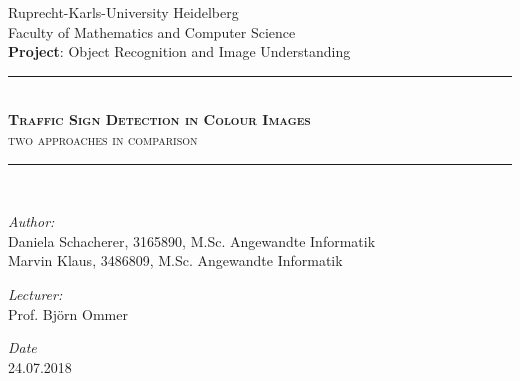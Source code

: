 \documentclass[12pt,a4paper,bibliography=totocnumbered,listof=totocnumbered]{scrartcl}
\begin{document}
\begin{titlepage}

\newcommand{\HRule}{\rule{\linewidth}{0.5mm}} %

\center %

\LARGE Ruprecht-Karls-University Heidelberg \\[0.5cm] %
\Large Faculty of Mathematics and Computer Science \\[1.5cm]
\Large \textbf{Project}: Object Recognition and Image Understanding\\[0.5cm] %

\HRule \\[0.4cm]
{ \textsc{\huge \bfseries Traffic Sign Detection in Colour Images}}\\ \textsc{\Large two approaches in comparison}\\[0.4cm] %
\HRule \\[1.5cm]

\begin{minipage}{0.4\textwidth}
\begin{flushleft} \large
\emph{Author:}\\
Daniela Schacherer, 3165890, M.Sc. Angewandte Informatik \\
Marvin Klaus, 3486809, M.Sc. Angewandte Informatik \\%
\end{flushleft}

\begin{flushleft} \large
\emph{Lecturer:}\\
Prof. Björn Ommer \\ %
\end{flushleft}

\begin{flushleft} \large
\emph{Date}\\
24.07.2018 \\%
\end{flushleft}

\end{minipage}
~
\begin{minipage}{0.4\textwidth}
\end{minipage}\\[4cm]

\vfill %

\end{titlepage}
\end{document}
